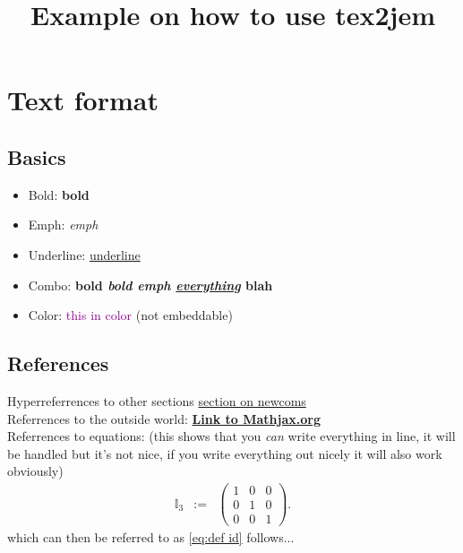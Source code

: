 

\newcommand{\bcite}[1]{\href{#1}{\textbf{Link}.}}
\newcommand{\RR}{$\mathbb R$}
\newcommand{\eqa}[1]{\begin{eqnarray}#1\end{eqnarray}}

\title{Example on how to use tex2jem}


\maketitle

\section{Text format}
\subsection{Basics}
\begin{itemize}
    \item Bold: \textbf{bold}
    \item Emph: \emph{emph}
    \item Underline: \underline{underline}
    \item Combo: \textbf{bold \emph{bold emph \underline{everything}} blah}
    \item Color: \textcolor{DarkMagenta}{this in color} (not embeddable)
\end{itemize}

\subsection{References}
Hyperreferrences to other sections \hyperref[sec:newcom]{section on newcoms}\\
Referrences to the outside world: \href{http://www.mathjax.org}{\textbf{Link to Mathjax.org}}\\
Referrences to equations: (this shows that you \emph{can} write everything in line, it will be handled but it's not nice, if you write everything out nicely it will also work obviously)
\eqa{ \mathbb I_3 &:=& \left(\begin{array}{ccc}1&0&0\\0&1&0\\0&0&1 \end{array}\right).\label{eq:def id}}
which can then be referred to as \eqref{eq:def id} follows...\\

